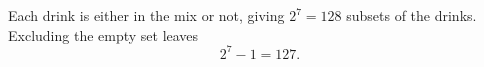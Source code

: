 Each drink is either in the mix or not, giving \(2^7=128\) subsets of the drinks. Excluding the empty set leaves
\[
2^7-1=\boxed{127}.
\]

